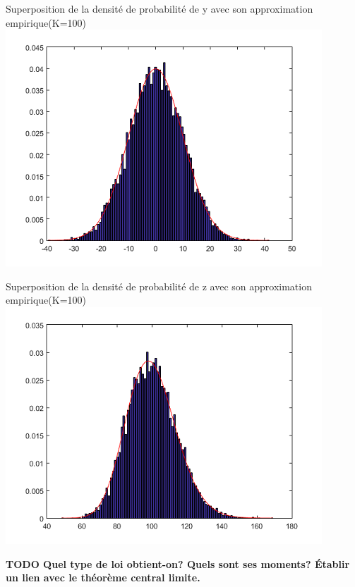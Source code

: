 \documentclass[12pt]{article}
\begin{document}
\begin{flushleft}
Superposition de la densité de probabilité de y avec
\smallbreak
 son approximation empirique(K=100)
\includegraphics{3_17_y_100.PNG}
\end{flushleft}

\begin{flushleft}
Superposition de la densité de probabilité de z 
\smallbreak
 avec son approximation empirique(K=100)
\includegraphics{3_17_z_100.PNG}
\end{flushleft}

\textbf{TODO Quel type de loi obtient-on? Quels sont ses moments? Établir un lien avec le théorème central limite.}

\smallbreak
\end{document}
